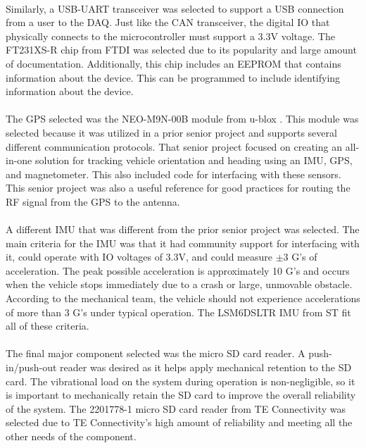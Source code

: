 \paragraph{}
Similarly, a USB-UART transceiver was selected to support a USB connection from a user to the DAQ.
Just like the CAN transceiver, the digital IO that physically connects to the microcontroller must support a 3.3V voltage.
The FT231XS-R chip from FTDI \cite{USBProductPage} was selected due to its popularity and large amount of documentation.
Additionally, this chip includes an EEPROM that contains information about the device.
This can be programmed to include identifying information about the device.

\paragraph{}
The GPS selected was the NEO-M9N-00B module from u-blox \cite{GPSProductPage}.
This module was selected because it was utilized in a prior senior project and supports several different communication protocols.
That senior project focused on creating an all-in-one solution for tracking vehicle orientation and heading using an IMU, GPS, and magnetometer.
This also included code for interfacing with these sensors.
This senior project was also a useful reference for good practices for routing the RF signal from the GPS to the antenna.

\paragraph{}
A different IMU that was different from the prior senior project was selected.
The main criteria for the IMU was that it had community support for interfacing with it, could operate with IO voltages of 3.3V, and could measure $\pm$3 G's of acceleration.
The peak possible acceleration is approximately 10 G's and occurs when the vehicle stops immediately due to a crash or large, unmovable obstacle.
According to the mechanical team, the vehicle should not experience accelerations of more than 3 G's under typical operation.
The LSM6DSLTR IMU from ST \cite{IMUProductPage} fit all of these criteria.

\paragraph{}
The final major component selected was the micro SD card reader.
A push-in/push-out reader was desired as it helps apply mechanical retention to the SD card.
The vibrational load on the system during operation is non-negligible, so it is important to mechanically retain the SD card to improve the overall reliability of the system.
The 2201778-1 micro SD card reader from TE Connectivity \cite{SDReaderProductPage} was selected due to TE Connectivity's high amount of reliability and meeting all the other needs of the component.

